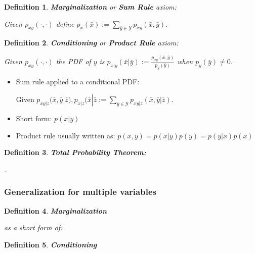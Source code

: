 \documentclass[10pt,a4paper]{scrartcl}
\newtheorem{define}{Definition}
\begin{document}
\begin{multicols*}{2}
{\begin{define}
\textbf{Marginalization} or \textbf{Sum Rule} axiom:

Given $p_{xy}(\cdot,\cdot)$ define $p_x(\bar{x}):=\sum\limits_{\bar{y}\in\mathcal{Y}}p_{xy}(\bar{x},\bar{y})$.
\end{define}

\begin{define}
\textbf{Conditioning} or \textbf{Product Rule} axiom:

Given $p_{xy}(\cdot,\cdot)$ the PDF of $y$ is $p_{x|y}(\bar{x}|\bar{y}):=\frac{p_{xy}(\bar{x},\bar{y})}{p_y(\bar{y})}$ when $p_y(\bar{y})\neq 0$.
\end{define}

\begin{itemize}
\item Sum rule applied to a conditional PDF:

Given $p_{xy|z}(\bar{x},\bar{y}|\bar{z}),p_{x|z}(\bar{x}|\bar{z}:=\sum\limits_{\bar{y}\in\mathcal{Y}}p_{xy|z}(\bar{x},\bar{y}|\bar{z})$.
\item Short form: $p(x|y)$
\item Product rule usually written as: $p(x,y) = p(x|y)p(y) =p(y|x)p(x)$
\end{itemize}

\begin{define}
\textbf{Total Probability Theorem:}

.
\end{define}

\subsubsection{Generalization for multiple variables}

\begin{define}
\textbf{Marginalization}


as a short form of:

\end{define}

\begin{define}
\textbf{Conditioning}


\end{define}}
\end{multicols*}
\end{document}
